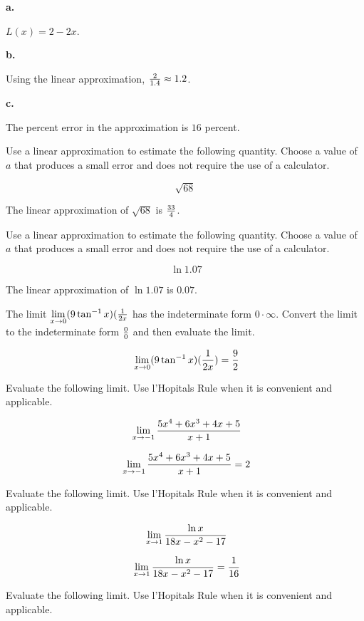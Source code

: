 {\par \bf a.}
$L(x) = 2 - 2x$.

{\par \bf b.}
Using the linear approximation, ${2 \over 1.4} \approx 1.2$.

{\par \bf c.}
The percent error in the approximation is $16$ percent.

Use a linear approximation to estimate the following quantity.
Choose a value of $a$ that produces a small error and does
not require the use of a calculator.

$$
\sqrt{68}
$$

The linear approximation of $\sqrt{68}$ is ${33 \over 4}$.

Use a linear approximation to estimate the following quantity.
Choose a value of $a$ that produces a small error and does
not require the use of a calculator.

$$\
\ln{1.07}
$$

The linear approximation of $\ln{1.07}$ is $0.07$.

 \bigskip
{} \bigskip
{} \bigskip
{}
The limit $\lim\limits_{x \to 0} (9 \tan^{-1}x)({1 \over 2x}$
has the indeterminate form $0 \cdot \infty$. Convert
the limit to the indeterminate form $0 \over 0$ and then
evaluate the limit.

$$\
\lim\limits_{x \to 0}
(9 \tan^{-1}x)({1 \over 2x}) = {9 \over 2}
$$

 \bigskip
{} \bigskip
{}
Evaluate the following limit. Use l'Hopitals Rule when it is convenient
and applicable.

$$\
\lim_{x \to -1} {5x^4 + 6x^3 + 4x + 5 \over x + 1}
$$

$$\
\lim_{x \to -1} {5x^4 + 6x^3 + 4x + 5 \over x + 1} = 2
$$

Evaluate the following limit. Use l'Hopitals Rule when it is convenient
and applicable.

$$\
\lim_{x \to 1}
{\ln x \over 18x - x^2 -17}
$$


$$\
\lim_{x \to 1}
{\ln x \over 18x - x^2 -17} = {1 \over 16}
$$

Evaluate the following limit. Use l'Hopitals Rule when it is convenient
and applicable.

